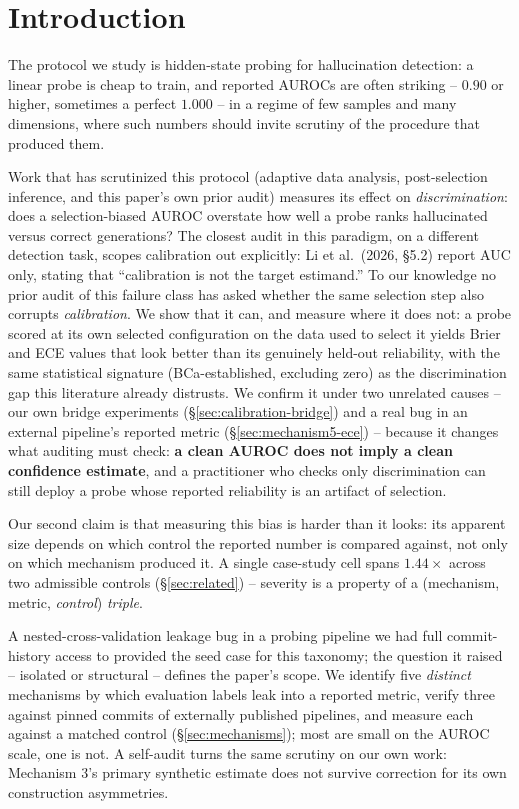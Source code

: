 \documentclass{article}
\begin{document}
\section{Introduction}

The protocol we study is
hidden-state probing for hallucination detection: a linear probe is cheap to
train, and reported AUROCs are often striking -- $0.90$ or higher, sometimes a
perfect $1.000$ -- in a regime of few samples and many dimensions, where such
numbers should invite scrutiny of the procedure that produced them.

Work that has scrutinized this protocol (adaptive data analysis,
post-selection inference, and this paper's own prior audit) measures its effect
on \emph{discrimination}: does a selection-biased AUROC overstate how well a
probe ranks hallucinated versus correct generations? The closest audit in this
paradigm, on a different detection task, scopes calibration out explicitly:
Li et al.\ (2026, \S5.2) report AUC only, stating that ``calibration is not the
target estimand.'' To our knowledge no prior audit of this failure class has asked whether the
same selection step also corrupts \emph{calibration}. We show that it can, and
measure where it does not: a probe
scored at its own selected configuration on the data used to select it yields
Brier and ECE values that look better than its genuinely held-out reliability,
with the same statistical signature (BCa-established, excluding zero) as the
discrimination gap this literature already distrusts. We confirm it under two
unrelated causes -- our own bridge experiments
(\S\ref{sec:calibration-bridge}) and a real bug in an external pipeline's
reported metric (\S\ref{sec:mechanism5-ece}) -- because it changes what
auditing must check: \textbf{a clean AUROC does not imply a clean confidence
estimate}, and a practitioner who checks only discrimination can still deploy
a probe whose reported reliability is an artifact of selection.

Our second claim is that measuring this bias is harder than it looks: its
apparent size depends on which control the reported number is compared against,
not only on which mechanism produced it. A single case-study cell spans
$1.44\times$ across two admissible controls (\S\ref{sec:related}) --
severity is a property of a (mechanism, metric, \emph{control}) \emph{triple}.

A nested-cross-validation leakage bug in a probing pipeline we had full
commit-history access to provided the seed case for this taxonomy; the
question it raised -- isolated or structural -- defines the paper's scope. We identify five \emph{distinct} mechanisms by
which evaluation labels leak into a reported metric, verify three against
pinned commits of externally published pipelines, and measure each against a
matched control (\S\ref{sec:mechanisms}); most are small on the AUROC scale,
one is not. A self-audit turns the same scrutiny on our own work: Mechanism 3's
primary synthetic estimate does not survive correction for its own
construction asymmetries.
\end{document}

